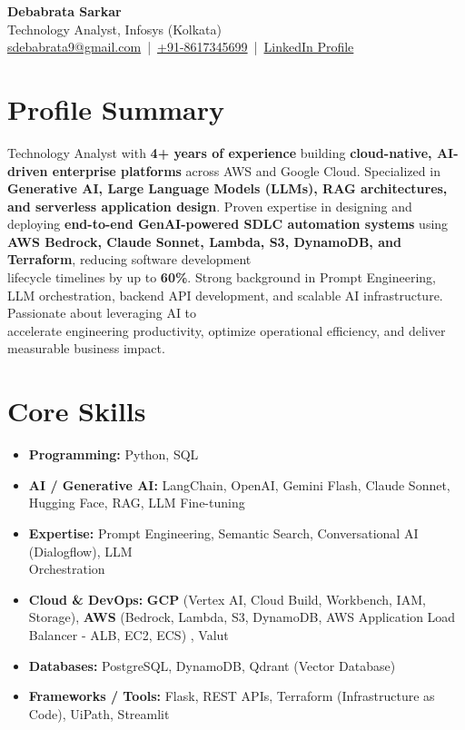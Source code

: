 \documentclass[a4paper,11pt]{article}
\begin{document}
\begin{center}
    {\Huge \bfseries Debabrata Sarkar} \\[12pt]
    Technology Analyst, Infosys (Kolkata) \\[6pt]
    \href{mailto:sdebabrata9@gmail.com}{sdebabrata9@gmail.com} \,|\, 
    \href{tel:+918617345699}{+91-8617345699} \,|\, 
    \href{https://www.linkedin.com/in/debabrata-sarkar-genai/}{LinkedIn Profile}
\end{center}

\vspace{8pt}

\section*{Profile Summary}
Technology Analyst with \textbf{4+ years of experience} building \textbf{cloud-native, AI-driven enterprise platforms} across AWS and Google Cloud. Specialized in \textbf{Generative AI, Large Language Models (LLMs), RAG architectures, and serverless application design}. Proven expertise in designing and deploying \textbf{end-to-end GenAI-powered SDLC automation systems} using \textbf{AWS Bedrock, Claude Sonnet, Lambda, S3, DynamoDB, and Terraform}, reducing software development \\lifecycle timelines by up to \textbf{60\%}. Strong background in Prompt Engineering, LLM orchestration, backend API development, and scalable AI infrastructure. Passionate about leveraging AI to \\accelerate engineering productivity, optimize operational efficiency, and deliver measurable business impact.

\section*{Core Skills}
\begin{itemize}
    \item \textbf{Programming:} Python, SQL
    \item \textbf{AI / Generative AI:} LangChain, OpenAI, Gemini Flash, Claude Sonnet, Hugging Face, RAG, LLM Fine-tuning
    \item \textbf{Expertise:} Prompt Engineering, Semantic Search, Conversational AI (Dialogflow), LLM \\Orchestration
    \item \textbf{Cloud \& DevOps:} \textbf{GCP} (Vertex AI, Cloud Build, Workbench, IAM, Storage), \textbf{AWS} (Bedrock, Lambda, S3, DynamoDB, AWS Application Load Balancer - ALB, EC2, ECS) , Valut
    \item \textbf{Databases:} PostgreSQL, DynamoDB, Qdrant (Vector Database)
    \item \textbf{Frameworks / Tools:} Flask, REST APIs, Terraform (Infrastructure as Code), UiPath, Streamlit
\end{itemize}
\end{document}
